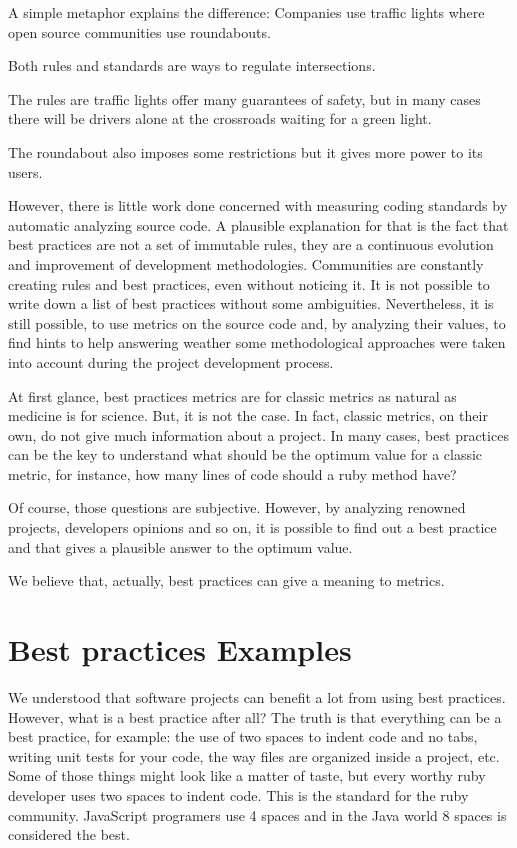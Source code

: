 A simple metaphor explains the difference:
Companies use traffic lights where open source communities use roundabouts.


Both rules and standards are ways to regulate intersections.

The rules are traffic lights offer many guarantees of safety, but in many cases there will be drivers alone at the crossroads waiting for a green light.

The roundabout also imposes some restrictions but it gives more power to its users.





However, there is little work done concerned with measuring coding standards by automatic analyzing source code.
A plausible explanation for that is the fact that best practices are not a set of immutable rules,
they are a continuous evolution and improvement of development methodologies.
Communities are constantly creating rules and best practices, even without noticing it.
It is not possible to write down a list of best practices without some ambiguities.
Nevertheless, it is still possible, to use metrics on the source code and, by analyzing their values,
to find hints to help answering weather some methodological approaches
were taken into account during the project development process.

At first glance, best practices metrics are for classic metrics as natural as medicine is for science.
But, it is not the case.
In fact, classic metrics, on their own, do not give much information about a project.
In many cases, best practices can be the key to understand what should be the optimum value for a classic metric,
for instance, how many lines of code should a ruby method have?

Of course, those questions are subjective.
However, by analyzing renowned projects, developers opinions and so on, it is possible to find out a best practice
and that gives a plausible answer to the optimum value.

We believe that, actually, best practices can give a meaning to metrics.



\section{Best practices Examples} \label{sec:best_practices_examples}
We understood that software projects can benefit a lot from using best practices.
However, what is a best practice after all?
The truth is that everything can be a best practice, for example:
the use of two spaces to indent code and no tabs, 
writing unit tests for your code,
the way files are organized inside a project, etc.
Some of those things might look like a matter of taste,
but every worthy ruby developer uses two spaces to indent code.
This is the standard for the ruby community.
JavaScript programers use 4 spaces
and in the Java world 8 spaces is considered the best.

